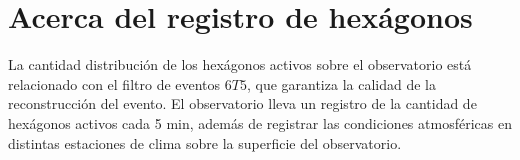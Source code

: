 \section{Acerca del registro de hexágonos}\label{hexagonos_rate}

La cantidad distribución de los hexágonos activos sobre el observatorio está relacionado con el filtro de eventos $6T5$, que garantiza la calidad de la reconstrucción del evento. El observatorio lleva un registro de la cantidad de hexágonos activos cada 5 min, además de registrar las condiciones atmosféricas en distintas estaciones de clima sobre la superficie del observatorio. 

